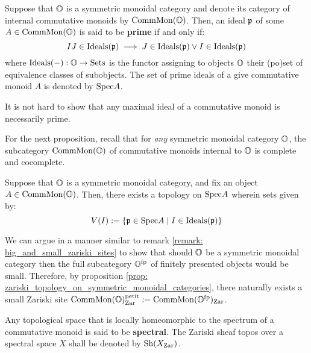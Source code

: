             \begin{definition} \label{def: prime_ideals_in_symmetric_monoidal_categories}
                Suppose that $\mathbb{O}$ is a symmetric monoidal category and denote its category of internal commutative monoids by $\mathrm{Comm}\mathrm{Mon}(\mathbb{O})$. Then, an ideal $\mathfrak{p}$ of some $A \in \mathrm{Comm}\mathrm{Mon}(\mathbb{O})$ is said to be \textbf{prime} if and only if:
                    $$IJ \in \mathrm{Ideals}(\mathfrak{p}) \implies J \in \mathrm{Ideals}(\mathfrak{p}) \vee I \in \mathrm{Ideals}(\mathfrak{p})$$
                where $\mathrm{Ideals}(-): \mathbb{O} \to \mathrm{Sets}$ is the functor assigning to objects $\mathbb{O}$ their (po)set of equivalence classes of subobjects. The set of prime ideals of a give commutative monoid $A$ is denoted by $\mathrm{Spec} A$.
            \end{definition}
            \begin{remark}
                It is not hard to show that any maximal ideal of a commutative monoid is necessarily prime.
            \end{remark}
            
            For the next proposition, recall that for \textit{any} symmetric monoidal category $\mathbb{O}$, the subcategory $\mathrm{Comm}\mathrm{Mon}(\mathbb{O})$ of commutative monoids internal to $\mathbb{O}$ is complete and cocomplete.
            \begin{proposition} \label{prop: zariski_topology_on_symmetric_monoidal_categories}
                Suppose that $\mathbb{O}$ is a symmetric monoidal category, and fix an object $A \in \mathrm{Comm}\mathrm{Mon}(\mathbb{O})$. Then, there exists a topology on $\mathrm{Spec} A$ wherein sets given by:
                    $$V(I) := \{\mathfrak{p} \in \mathrm{Spec} A \mid I \in \mathrm{Ideals}(\mathfrak{p})\}$$
            \end{proposition}
            \begin{corollary} \label{coro: small_zariski_sites_in_symmetric_monoidal_categories}
                We can argue in a manner similar to remark \ref{remark: big_and_small_zariski_sites} to show that should $\mathbb{O}$ be a symmetric monoidal category then the full subcategory $\mathbb{O}^{\mathrm{fp}}$ of finitely presented objects would be small. Therefore, by proposition \ref{prop: zariski_topology_on_symmetric_monoidal_categories}, there naturally exists a small Zariski site $\mathrm{Comm}\mathrm{Mon}(\mathbb{O})_{\mathrm{Zar}}^{\mathrm{petit}} := \mathrm{Comm}\mathrm{Mon}(\mathbb{O}^{\mathrm{fp}})_{\mathrm{Zar}}$. 
            \end{corollary}
            \begin{convention}
                Any topological space that is locally homeomorphic to the spectrum of a commutative monoid is said to be \textbf{spectral}. The Zariski sheaf topos over a spectral space $X$ shall be denoted by $\mathrm{Sh}(X_{\mathrm{Zar}})$. 
            \end{convention}
            
